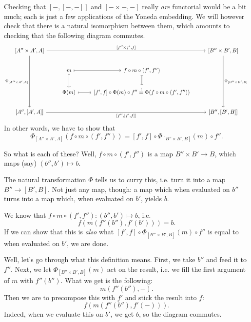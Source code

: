 \documentclass[a4paper]{report}
\theoremstyle{definition}
\theoremstyle{plain}
\theoremstyle{remark}
\begin{document}
Checking that $[-,[-,-]]$ and $[-\times-, -]$ really \emph{are} functorial would be a bit much; each is just a few applications of the Yoneda embedding. We will however check that there is a natural isomorphism between them, which amounts to checking that the following diagram commutes.
\begin{equation*}
  \begin{tikzcd}
    {[A'' \times A', A]}
    \arrow[rrr, "{[f'' \times f', f]}"]
    \arrow[ddd, swap, "{\Phi_{[A'' \times A', A]}}"]
    & & & {[B'' \times B', B]}
    \arrow[ddd, "{\Phi_{[B'' \times B', B]}}"]
    \\
    & m
    \arrow[d, mapsto]
    \arrow[r, mapsto]
    & f \circ m \circ (f', f'')
    \arrow[d, mapsto]
    \\
    & \Phi(m)
    \arrow[r, mapsto]
    & {[f', f] \circ \Phi(m) \circ f'' \stackrel{!}{=} \Phi(f \circ m \circ (f', f''))} 
    \\
    {[A'', [A', A]]}
    \arrow[rrr, swap, "{[f'', [f', f]]}"]
    & & & {[B'', [B', B]]}
  \end{tikzcd}
\end{equation*}
In other words, we have to show that 
\begin{equation*}
  \Phi_{[A'' \times A', A]}(f \circ m \circ (f', f'')) = [f', f] \circ \Phi_{[B'' \times B', B]}(m) \circ f''.
\end{equation*}

So what is each of these? Well, $f \circ m \circ (f', f'')$ is a map $B'' \times B' \to B$, which maps (say) $(b'', b') \mapsto b$. 

The natural transformation $\Phi$ tells us to curry this, i.e. turn it into a map $B'' \to [B', B]$. Not just any map, though: a map which when evaluated on $b''$ turns into a map which, when evaluated on $b'$, yields $b$.

We know that $f \circ m \circ (f', f'')\colon (b'', b') \mapsto b$, i.e.
\begin{equation*}
  f(m(f''(b''), f'(b'))) = b.
\end{equation*}
If we can show that this is \emph{also} what $[f', f] \circ \Phi_{[B'' \times B', B]}(m) \circ f''$ is equal to when evaluated on $b'$, we are done.

Well, let's go through what this definition means. First, we take $b''$ and feed it to $f''$. Next, we let $\Phi_{[B'' \times B', B]}(m)$ act on the result, i.e. we fill the first argument of $m$ with $f''(b'')$. What we get is the following:
\begin{equation*}
  m(f''(b''), -).
\end{equation*}
Then we are to precompose this with $f'$ and stick the result into $f$:
\begin{equation*}
  f(m(f''(b''), f'(-))).
\end{equation*}
Indeed, when we evaluate this on $b'$, we get $b$, so the diagram commutes.
\end{document}

